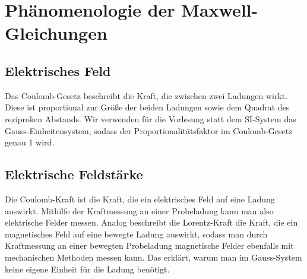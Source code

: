 \documentclass{../../theo-lecture/lecture}
\begin{document}
    \chapter{Phänomenologie der Maxwell-Gleichungen}
    \section{Elektrisches Feld}
    Das Coulomb-Gesetz beschreibt die Kraft, die zwischen zwei Ladungen wirkt. Diese ist proportional zur Größe der beiden Ladungen sowie dem Quadrat des reziproken Abstands. Wir verwenden für die Vorlesung statt dem SI-System das Gauss-Einheitensystem, sodass der Proportionalitätsfaktor im Coulomb-Gesetz genau 1 wird.
    \section{Elektrische Feldstärke}
    Die Coulomb-Kraft ist die Kraft, die ein elektrisches Feld auf eine Ladung auswirkt. Mithilfe der Kraftmessung an einer Probeladung kann man also elektrische Felder messen. Analog beschreibt die Lorentz-Kraft die Kraft, die ein magnetisches Feld auf eine bewegte Ladung auswirkt, sodass man durch Kraftmessung an einer bewegten Probeladung magnetische Felder ebenfalls mit mechanischen Methoden messen kann. Das erklärt, warum man im Gauss-System keine eigene Einheit für die Ladung benötigt.
\end{document}
